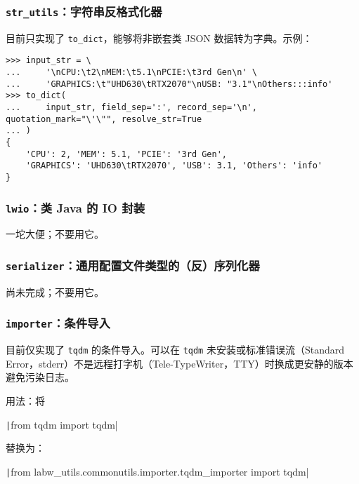 \documentclass[pdf,9pt]{beamer}
\begin{document}
    \subsubsection{\texttt{str\_utils}：字符串反格式化器}

    \begin{frame}[fragile]{\subsubsecname}

        目前只实现了 \Verb|to_dict|，能够将非嵌套类 JSON 数据转为字典。示例：

        \begin{verbatim}
>>> input_str = \
...     '\nCPU:\t2\nMEM:\t5.1\nPCIE:\t3rd Gen\n' \
...     'GRAPHICS:\t"UHD630\tRTX2070"\nUSB: "3.1"\nOthers:::info'
>>> to_dict(
...     input_str, field_sep=':', record_sep='\n', quotation_mark="\'\"", resolve_str=True
... )
{
    'CPU': 2, 'MEM': 5.1, 'PCIE': '3rd Gen',
    'GRAPHICS': 'UHD630\tRTX2070', 'USB': 3.1, 'Others': 'info'
}
        \end{verbatim}
    \end{frame}

    \subsubsection{\texttt{lwio}：类 Java 的 IO 封装}

    \begin{frame}{\subsubsecname}
        一坨大便；不要用它。
    \end{frame}

    \subsubsection{\texttt{serializer}：通用配置文件类型的（反）序列化器}

    \begin{frame}{\subsubsecname}
        尚未完成；不要用它。
    \end{frame}
    
    \subsubsection{\texttt{importer}：条件导入}

    \begin{frame}{\subsubsecname}
        目前仅实现了 \Verb|tqdm| 的条件导入。可以在 \Verb|tqdm| 未安装或标准错误流（Standard Error，stderr）不是远程打字机（Tele-TypeWriter，TTY）时换成更安静的版本避免污染日志。

        用法：将 

        \texttt|from tqdm import tqdm|

        替换为：

        \texttt|from labw_utils.commonutils.importer.tqdm_importer import tqdm|
    \end{frame}
\end{document}
